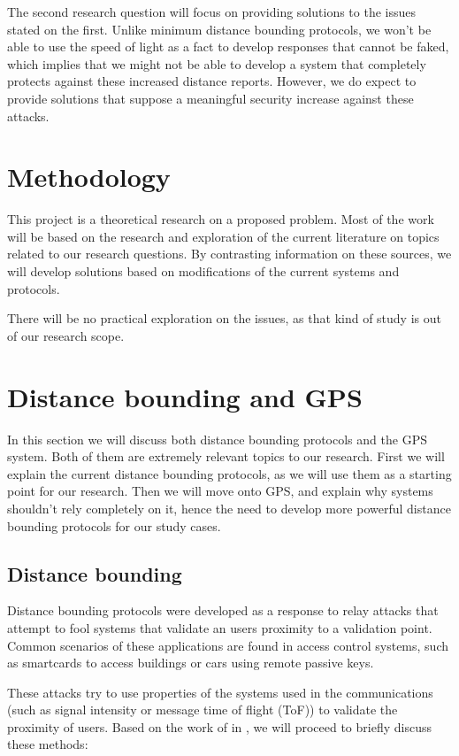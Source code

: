 \documentclass{article}
\begin{document}
The second research question will focus on providing solutions to the issues stated on the first. Unlike minimum distance bounding protocols, we won't be able to use the speed of light as a fact to develop responses that cannot be faked, which implies that we might not be able to develop a system that completely protects against these increased distance reports. However, we do expect to provide solutions that suppose a meaningful security increase against these attacks.

\section{Methodology}

This project is a theoretical research on a proposed problem. Most of the work will be based on the research and exploration of the current literature on topics related to our research questions. By contrasting information on these sources, we will develop solutions based on modifications of the current systems and protocols.

There will be no practical exploration on the issues, as that kind of study is out of our research scope.

\section{Distance bounding and GPS}

In this section we will discuss both distance bounding protocols and the GPS system. Both of them are extremely relevant topics to our research. First we will explain the current distance bounding protocols, as we will use them as a starting point for our research. Then we will move onto GPS, and explain why systems shouldn't rely completely on it, hence the need to develop more powerful distance bounding protocols for our study cases.

\subsection{Distance bounding}

Distance bounding protocols were developed as a response to relay attacks that attempt to fool systems that validate an users proximity to a validation point. Common scenarios of these applications are found in access control systems, such as smartcards to access buildings or cars using remote passive keys.

These attacks try to use properties of the systems used in the communications (such as signal intensity or message time of flight (ToF)) to validate the proximity of users. Based on the work of \citeauthor{capkun2006secure} in \cite{capkun2006secure}, we will proceed to briefly discuss these methods:
\end{document}
